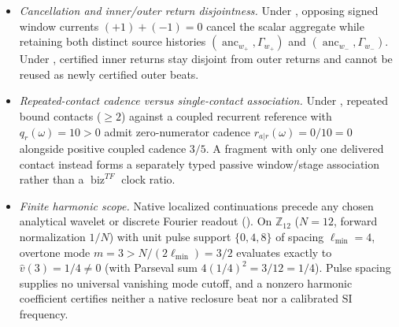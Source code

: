 \begin{itemize}[leftmargin=1.6em,itemsep=2pt]
each contribute \(\Delta\operatorname{bip}=0\) without blocking later seating.
With an admitted closure certificate (),
the recipient lineage's initial closure \(C_{i_{\mathrm{rec}},0}\) (\(j=0\))
contributes \(\Delta\Phi=1_C\) and \(\Delta\operatorname{bip}=0\); replay of an
already counted \(\operatorname{id}_{\mathrm{return}}\) adds \(0\) beats;
only a fresh compatible completion (\(j\ge 1\), \(k_j\in\omega_{\mathrm{rec}}\))
following emission and seating adds \(\Delta\operatorname{bip}=+1\).
\item \emph{Cancellation and inner/outer return disjointness.} Under
, opposing signed window
currents \((+1)+(-1)=0\) cancel the scalar aggregate while retaining both
distinct source histories \((\operatorname{anc}_{w_+},\Gamma_{w_+})\) and
\((\operatorname{anc}_{w_-},\Gamma_{w_-})\). Under
, certified inner returns stay disjoint
from outer returns and cannot be reused as newly certified outer beats.
\item \emph{Repeated-contact cadence versus single-contact association.}
Under , repeated bound contacts
(\(\ge 2\)) against a coupled recurrent reference with \(q_r(\omega)=10>0\)
admit zero-numerator cadence \(r_{a|r}(\omega)=0/10=0\) alongside positive
coupled cadence \(3/5\). A fragment with only one delivered contact instead
forms a separately typed passive window/stage association rather than a
\(\operatorname{biz}^{TF}\) clock ratio.
\item \emph{Finite harmonic scope.} Native localized continuations precede any
chosen analytical wavelet or discrete Fourier readout
(). On \(\mathbb Z_{12}\) (\(N=12\),
forward normalization \(1/N\)) with unit pulse support \(\{0,4,8\}\) of spacing
\(\ell_{\min}=4\), overtone mode \(m=3>N/(2\ell_{\min})=3/2\) evaluates
exactly to \(\hat v(3)=1/4\neq 0\) (with Parseval sum \(4(1/4)^2=3/12=1/4\)).
Pulse spacing supplies no universal vanishing mode cutoff, and a nonzero
harmonic coefficient certifies neither a native reclosure beat nor a calibrated
SI frequency.
\end{itemize}

